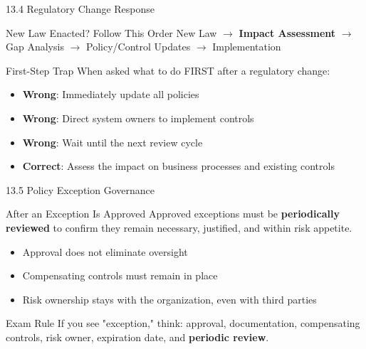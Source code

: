 \documentclass{beamer}
\begin{document}
	\begin{frame}{13.4 Regulatory Change Response}
		\begin{block}{New Law Enacted? Follow This Order}
			New Law $\rightarrow$ \textbf{Impact Assessment} $\rightarrow$ Gap Analysis $\rightarrow$ Policy/Control Updates $\rightarrow$ Implementation
		\end{block}
		
		\begin{alertblock}{First-Step Trap}
			When asked what to do FIRST after a regulatory change:
			\begin{itemize}
				\item \textbf{Wrong}: Immediately update all policies
				\item \textbf{Wrong}: Direct system owners to implement controls
				\item \textbf{Wrong}: Wait until the next review cycle
				\item \textbf{Correct}: Assess the impact on business processes and existing controls
			\end{itemize}
		\end{alertblock}
	\end{frame}
	
	\begin{frame}{13.5 Policy Exception Governance}
		\begin{block}{After an Exception Is Approved}
			Approved exceptions must be \textbf{periodically reviewed} to confirm they remain necessary, justified, and within risk appetite.
		\end{block}
		
		\begin{itemize}
			\item Approval does not eliminate oversight
			\item Compensating controls must remain in place
			\item Risk ownership stays with the organization, even with third parties
		\end{itemize}
		
		\begin{alertblock}{Exam Rule}
			If you see "exception," think: approval, documentation, compensating controls, risk owner, expiration date, and \textbf{periodic review}.
		\end{alertblock}
	\end{frame}
	
\end{document}

